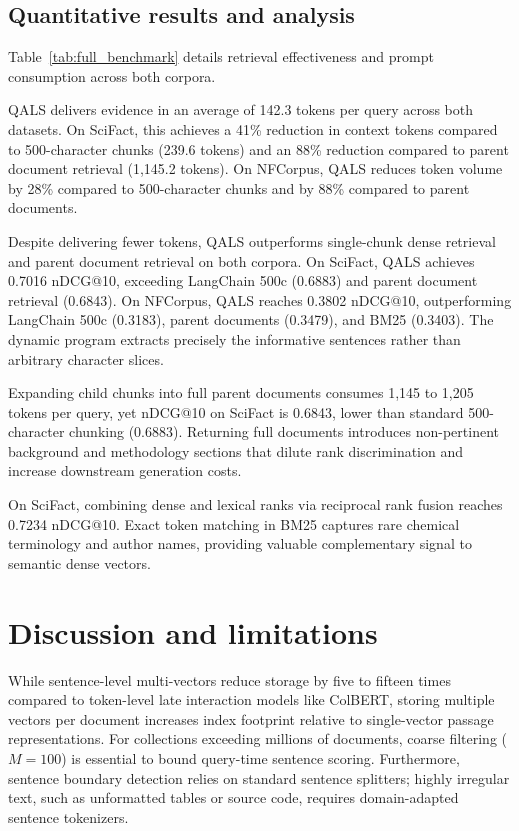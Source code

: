 \documentclass[preprint,12pt]{article}
\begin{document}
\subsection{Quantitative results and analysis}
Table~\ref{tab:full_benchmark} details retrieval effectiveness and prompt consumption across both corpora.

QALS delivers evidence in an average of 142.3 tokens per query across both datasets. On SciFact, this achieves a 41\% reduction in context tokens compared to 500-character chunks (239.6 tokens) and an 88\% reduction compared to parent document retrieval (1,145.2 tokens). On NFCorpus, QALS reduces token volume by 28\% compared to 500-character chunks and by 88\% compared to parent documents.

Despite delivering fewer tokens, QALS outperforms single-chunk dense retrieval and parent document retrieval on both corpora. On SciFact, QALS achieves 0.7016 nDCG@10, exceeding LangChain 500c (0.6883) and parent document retrieval (0.6843). On NFCorpus, QALS reaches 0.3802 nDCG@10, outperforming LangChain 500c (0.3183), parent documents (0.3479), and BM25 (0.3403). The dynamic program extracts precisely the informative sentences rather than arbitrary character slices.

Expanding child chunks into full parent documents consumes 1,145 to 1,205 tokens per query, yet nDCG@10 on SciFact is 0.6843, lower than standard 500-character chunking (0.6883). Returning full documents introduces non-pertinent background and methodology sections that dilute rank discrimination and increase downstream generation costs.

On SciFact, combining dense and lexical ranks via reciprocal rank fusion reaches 0.7234 nDCG@10. Exact token matching in BM25 captures rare chemical terminology and author names, providing valuable complementary signal to semantic dense vectors.

\section{Discussion and limitations}
While sentence-level multi-vectors reduce storage by five to fifteen times compared to token-level late interaction models like ColBERT, storing multiple vectors per document increases index footprint relative to single-vector passage representations. For collections exceeding millions of documents, coarse filtering ($M=100$) is essential to bound query-time sentence scoring. Furthermore, sentence boundary detection relies on standard sentence splitters; highly irregular text, such as unformatted tables or source code, requires domain-adapted sentence tokenizers.
\end{document}
